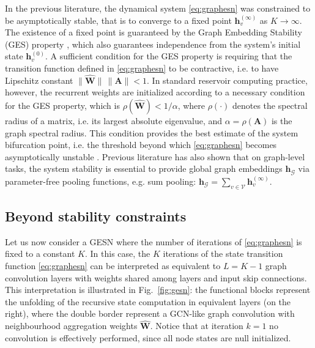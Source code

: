 \documentclass[final,5p,times,twocolumn]{elsarticle}
\begin{document}
In the previous literature, the dynamical system \eqref{eq:graphesn} was constrained to be asymptotically stable, that is to converge to a fixed point $\mathbf{h}_v^{(\infty)}$ as $K \to \infty$.
The existence of a fixed point is guaranteed by the Graph Embedding Stability (GES) property \cite{Gallicchio2020}, which also guarantees independence from the system's initial state $\mathbf{h}_v^{(0)}$.
A sufficient condition for the GES property is requiring that the transition function defined in \eqref{eq:graphesn} to be contractive, i.e. to have Lipschitz constant $\lVert \mathbf{\hat{W}} \rVert \, \lVert \mathbf{A} \rVert < 1$.
In standard reservoir computing practice, however, the recurrent weights are initialized according to a necessary condition \cite{Tortorella2022} for the GES property, which is $\rho(\mathbf{\hat{W}}) < 1 / \alpha$, where $\rho(\cdot)$ denotes the spectral radius of a matrix, i.e. its largest absolute eigenvalue, and $\alpha = \rho(\mathbf{A})$ is the graph spectral radius.
This condition provides the best estimate of the system bifurcation point, i.e. the threshold beyond which \eqref{eq:graphesn} becomes asymptotically unstable \citep{Tortorella2022}.
Previous literature has also shown that on graph-level tasks, the system stability is essential to provide global graph embeddings $\mathbf{h}_\mathcal{G}$ via parameter-free pooling functions, e.g. sum pooling: $\mathbf{h}_\mathcal{G} = \sum_{v \in \mathcal{V}} \mathbf{h}_v^{(\infty)}$.

\subsection{Beyond stability constraints}

Let us now consider a GESN where the number of iterations of \eqref{eq:graphesn} is fixed to a constant $K$.
In this case, the $K$ iterations of the state transition function \eqref{eq:graphesn} can be interpreted as equivalent to $L = K - 1$ graph convolution layers with weights shared among layers and input skip connections.
This interpretation is illustrated in Fig.~\ref{fig:gesn}: the functional blocks represent the unfolding of the recursive state computation in equivalent layers (on the right), where the double border represent a GCN-like graph convolution with neighbourhood aggregation weights $\mathbf{\hat{W}}$.
Notice that at iteration $k = 1$ no convolution is effectively performed, since all node states are null initialized.
\end{document}
